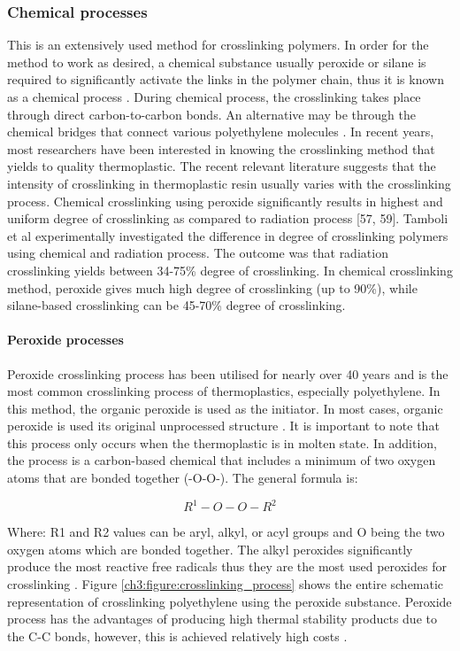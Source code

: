 \documentclass[12pt]{report}
\begin{document}
\subsubsection{Chemical processes}
This is an extensively used method for crosslinking polymers. In order for the method to work as desired, a chemical substance usually peroxide or silane is required to significantly activate the links in the polymer chain, thus it is known as a chemical process \cite{meola2005cross}. During chemical process, the crosslinking takes place through direct carbon-to-carbon bonds. An alternative may be through the chemical bridges that connect various polyethylene molecules \cite{kurtz2009cross}.  
In recent years, most researchers have been interested in knowing the crosslinking method that yields to quality thermoplastic. The recent relevant literature suggests that the intensity of crosslinking in thermoplastic resin usually varies with the crosslinking process. Chemical crosslinking using peroxide significantly results in highest and uniform degree of crosslinking as compared to radiation process [57, 59]. Tamboli et al \cite{meola2005cross} experimentally investigated the difference in degree of crosslinking polymers using chemical and radiation process. The outcome was that radiation crosslinking yields between 34-75\% degree of crosslinking. In chemical crosslinking method, peroxide gives much high degree of crosslinking (up to 90\%), while silane-based crosslinking can be 45-70\% degree of crosslinking.

\paragraph{Peroxide processes}
 Peroxide crosslinking process has been utilised for nearly over 40 years and is the most common crosslinking process of thermoplastics, especially polyethylene. In this method, the organic peroxide is used as the initiator. In most cases, organic peroxide is used its original unprocessed structure \cite{meola2005cross}. It is important to note that this process only occurs when the thermoplastic is in molten state. In addition, the process is a carbon-based chemical that includes a minimum of two oxygen atoms that are bonded together (-O-O-). The general formula is:  

 \begin{equation}
    R^1-O-O-R^2
 \end{equation}

Where: R1 and R2 values can be aryl, alkyl, or acyl groups and O being the two oxygen atoms which are bonded together. The alkyl peroxides significantly produce the most reactive free radicals thus they are the most used peroxides for crosslinking \cite{kurtz2009cross}. Figure \ref{ch3:figure:crosslinking_process} shows the entire schematic representation of crosslinking polyethylene using the peroxide substance. Peroxide process has the advantages of producing high thermal stability products due to the C-C bonds, however, this is achieved relatively high costs \cite{patterson2022cross}.
\end{document}
